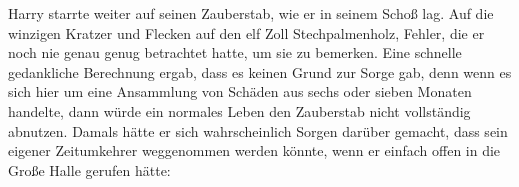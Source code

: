 Harry starrte weiter auf seinen Zauberstab, wie er in seinem Schoß lag. Auf die winzigen Kratzer und Flecken auf den elf Zoll Stechpalmenholz, Fehler, die er noch nie genau genug betrachtet hatte, um sie zu bemerken. Eine schnelle gedankliche Berechnung ergab, dass es keinen Grund zur Sorge gab, denn wenn es sich hier um eine Ansammlung von Schäden aus sechs oder sieben Monaten handelte, dann würde ein normales Leben den Zauberstab nicht vollständig abnutzen. Damals hätte er sich wahrscheinlich Sorgen darüber gemacht, dass sein eigener Zeitumkehrer weggenommen werden könnte, wenn er einfach offen in die Große Halle gerufen hätte:
